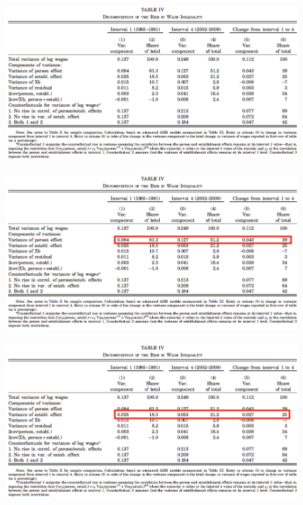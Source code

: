 \documentclass[notes=show]{beamer}
\begin{document}
\begin{frame}
\begin{figure}[p!]
 \includegraphics[width=\textwidth]{figures/Table4} 
\end{figure}
\end{frame}

\begin{frame}
\begin{figure}[p!]
 \includegraphics[width=\textwidth]{figures/Table4b} 
\end{figure}
\end{frame}

\begin{frame}
\begin{figure}[p!]
 \includegraphics[width=\textwidth]{figures/Table4c} 
\end{figure}
\end{frame}
\end{document}
